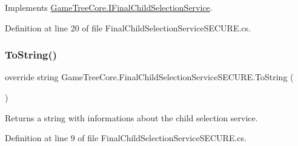 Implements \mbox{\hyperlink{interface_game_tree_core_1_1_i_final_child_selection_service}{Game\+Tree\+Core.\+I\+Final\+Child\+Selection\+Service}}.



Definition at line 20 of file Final\+Child\+Selection\+Service\+S\+E\+C\+U\+R\+E.\+cs.

\mbox{\label{class_game_tree_core_1_1_final_child_selection_service_s_e_c_u_r_e_a4286392c639860e2f188f853b43f8103}} 
\subsubsection{\texorpdfstring{To\+String()}{ToString()}}
{\footnotesize\ttfamily override string Game\+Tree\+Core.\+Final\+Child\+Selection\+Service\+S\+E\+C\+U\+R\+E.\+To\+String (\begin{DoxyParamCaption}{ }\end{DoxyParamCaption})}



Returns a string with informations about the child selection service. 



Definition at line 9 of file Final\+Child\+Selection\+Service\+S\+E\+C\+U\+R\+E.\+cs.

